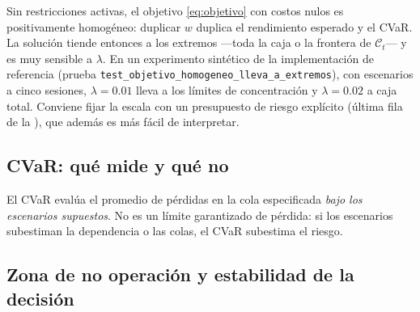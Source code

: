 \begin{notatecnica}
Sin restricciones activas, el objetivo \eqref{eq:objetivo} con costos nulos es positivamente homogéneo:
duplicar $w$ duplica el rendimiento esperado y el CVaR. La solución tiende entonces a los extremos
---toda la caja o la frontera de $\mathcal C_t$--- y es muy sensible a $\lambda$. En un experimento
sintético de la implementación de referencia (prueba \texttt{test\_objetivo\_homogeneo\_lleva\_a\_extremos}),
con escenarios a cinco sesiones, $\lambda=0.01$ lleva a los límites de concentración y $\lambda=0.02$ a
caja total. Conviene fijar la escala con un presupuesto de riesgo
explícito (última fila de la ), que además es más fácil de interpretar.
\end{notatecnica}

\subsection{CVaR: qué mide y qué no}\label{sec:cvar}



\begin{noconcluir}
El CVaR evalúa el promedio de pérdidas en la cola especificada \emph{bajo los escenarios supuestos}. No
es un límite garantizado de pérdida: si los escenarios subestiman la dependencia o las colas, el CVaR
subestima el riesgo.
\end{noconcluir}

\subsection{Zona de no operación y estabilidad de la decisión}\label{sec:no_operacion}

